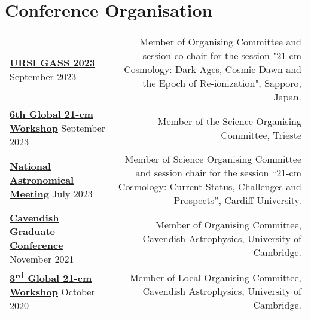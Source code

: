 \documentclass{article}
\begin{document}
\section*{Conference Organisation}

\begin{tabular}{l!{\vrule}r}
    \href{https://www.ursi-gass2023.jp}{\textbf{URSI GASS 2023}} September 2023 & Member of Organising Committee and session co-chair for the session "21-cm Cosmology: Dark Ages, Cosmic Dawn and the Epoch of Re-ionization", Sapporo, Japan. \\
    \href{https://global21cmworkshop.org/2023-ifpu/}{\textbf{6th Global 21-cm Workshop}} September 2023 & Member of the Science Organising Committee, Trieste \\
    \href{https://nam2023.org}{\textbf{National Astronomical Meeting}} July 2023 & Member of Science Organising Committee and session chair for the session “21-cm Cosmology: Current Status, Challenges and Prospects”, Cardiff University. \\
	\href{http://cavgradcon.soc.srcf.net/index.html}{\textbf{Cavendish Graduate Conference}} November 2021 & Member of Organising Committee, Cavendish Astrophysics, University of Cambridge.\\
	\href{https://sites.google.com/view/third21cmglobalworkshop/home?authuser=0}{\textbf{3\textsuperscript{rd} Global 21-cm Workshop}} October 2020 & Member of Local Organising Committee, Cavendish Astrophysics, University of Cambridge.	
\end{tabular}

\end{document}
